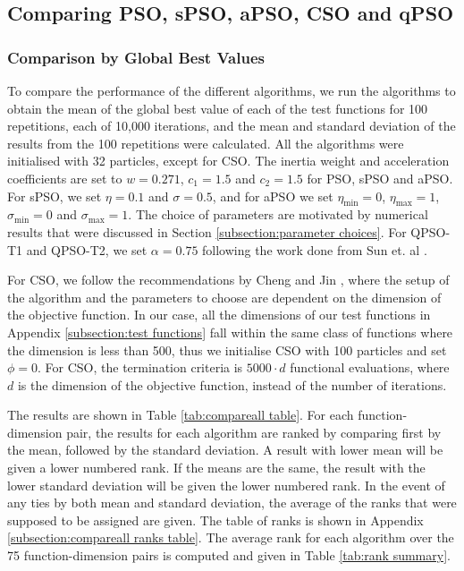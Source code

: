 \documentclass[12pt]{article}
\theoremstyle{definition}
\begin{document}
\subsection{Comparing PSO, sPSO, aPSO, CSO and qPSO}
\subsubsection{Comparison by Global Best Values}
\label{subsubsection:compareall min}
To compare the performance of the different algorithms, we run the algorithms to obtain the mean of the global best value of each of the test functions for 100 repetitions, each of 10,000 iterations, and the mean and standard deviation of the results from the 100 repetitions were calculated. All the algorithms were initialised with 32 particles, except for CSO. The inertia weight and acceleration coefficients are set to $w = 0.271$, $c_1 = 1.5$ and $c_2 = 1.5$ for PSO, sPSO and aPSO. For sPSO, we set $\eta = 0.1$ and $\sigma = 0.5$, and for aPSO we set $\eta_\text{min} = 0$, $\eta_\text{max} = 1$, $\sigma_\text{min} = 0$ and $\sigma_\text{max} = 1$. The choice of parameters are motivated by numerical results that were discussed in Section \ref{subsection:parameter choices}. For QPSO-T1 and QPSO-T2, we set $\alpha = 0.75$ following the work done from Sun et. al \cite{Sun2012ConvergenceAA}. \newline

For CSO, we follow the recommendations by Cheng and Jin \cite{chengjin2015}, where the setup of the algorithm and the parameters to choose are dependent on the dimension of the objective function. In our case, all the dimensions of our test functions in Appendix \ref{subsection:test functions} fall within the same class of functions where the dimension is less than 500, thus we initialise CSO with 100 particles and set $\phi = 0$. For CSO, the termination criteria is $5000 \cdot d$ functional evaluations, where $d$ is the dimension of the objective function, instead of the number of iterations. \newline

The results are shown in Table \ref{tab:compareall table}. For each function-dimension pair, the results for each algorithm are ranked by comparing first by the mean, followed by the standard deviation. A result with lower mean will be given a lower numbered rank. If the means are the same, the result with the lower standard deviation will be given the lower numbered rank. In the event of any ties by both mean and standard deviation, the average of the ranks that were supposed to be assigned are given. The table of ranks is shown in Appendix \ref{subsection:compareall ranks table}. The average rank for each algorithm over the 75 function-dimension pairs is computed and given in Table \ref{tab:rank summary}. \newline
\end{document}
